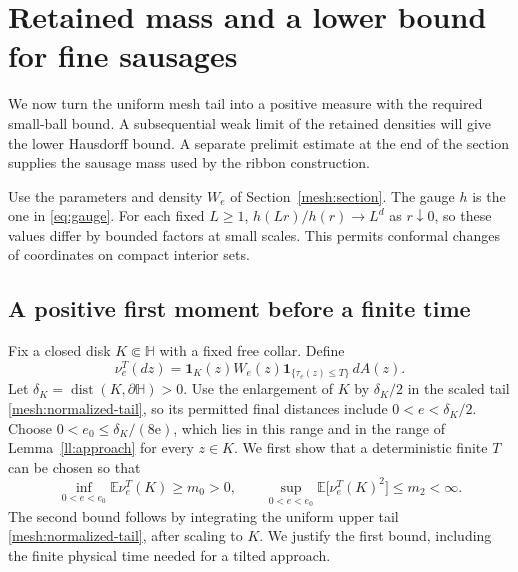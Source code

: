 \section{Retained mass and a lower bound for fine sausages}
\label{retain:section}

We now turn the uniform mesh tail into a positive measure with the
required small-ball bound.  A subsequential weak limit of the retained densities will give the
lower Hausdorff bound. A separate prelimit estimate at the end of the
section supplies the sausage mass used by the ribbon construction.

Use the parameters and density $W_e$ of Section~\ref{mesh:section}.
The gauge $h$ is the one in \eqref{eq:gauge}. For each fixed $L\ge1$,
$h(Lr)/h(r)\to L^d$ as $r\downarrow0$, so these values differ by
bounded factors at small scales. This permits conformal changes of
coordinates on compact interior sets.

\subsection{A positive first moment before a finite time}

Fix a closed disk $K\Subset\mathbb H$ with a fixed free collar.  Define
\[
 \nu_e^T(dz)=\mathbf1_K(z)W_e(z)
       \mathbf1_{\{\tau_e(z)\le T\}}\,dA(z).
\]
Let $\delta_K=\operatorname{dist}(K,\partial\mathbb H)>0$.
Use the enlargement of $K$ by $\delta_K/2$ in the scaled tail
\eqref{mesh:normalized-tail}, so its permitted final distances include
$0<e<\delta_K/2$.  Choose $0<e_0\le\delta_K/(8\mathrm e)$, which
lies in this range and in the range of Lemma~\ref{ll:approach} for
every $z\in K$.
We first show that a deterministic finite $T$ can be chosen so that
\begin{equation}
 \inf_{0<e<e_0}\mathbb E\nu_e^T(K)\ge m_0>0,
 \qquad
 \sup_{0<e<e_0}\mathbb E\bigl[\nu_e^T(K)^2\bigr]\le m_2<\infty.
 \label{retain:first-second}
\end{equation}
The second bound follows by integrating the uniform upper tail
\eqref{mesh:normalized-tail}, after scaling to $K$.  We justify the first bound,
including the finite physical time needed for a tilted approach.

